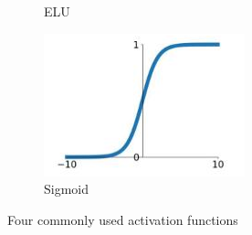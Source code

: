 \begin{figure}[H]
\begin{subfigure}{.5\textwidth}
  \caption{ELU}
  \label{fig:ELU}
\end{subfigure}
\begin{subfigure}{.5\textwidth}
  \centering
  \includegraphics[width=.8\linewidth]{figs/sigmoid.png}
  \caption{Sigmoid}
  \label{fig:Sigmoid}
\end{subfigure}
\caption{Four commonly used activation functions \cite{Acti}}
\label{fig:activfunc}
\end{figure}

